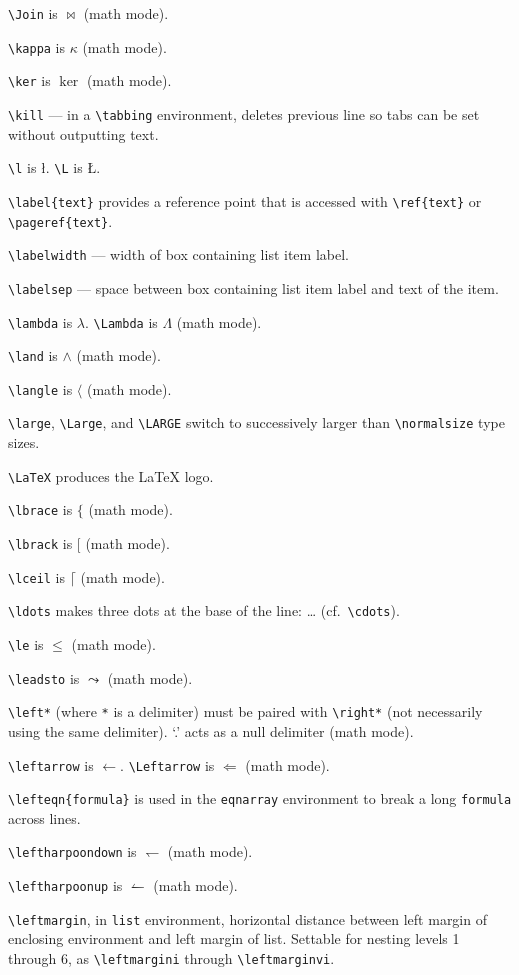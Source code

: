 \verb"\Join" is $\Join$ (math mode).

\verb"\kappa" is $\kappa$ (math mode).

\verb"\ker" is $\ker$ (math mode).

\verb"\kill" --- in a \verb"\tabbing" environment, deletes previous line so
	tabs can be set without outputting text.

\verb"\l" is \l.  \verb"\L" is \L.

\verb"\label{text}" provides a reference point that is accessed with
	\verb"\ref{text}" or \verb"\pageref{text}".

\verb"\labelwidth" --- width of box containing list item label.

\verb"\labelsep" --- space between box containing list item label and text
	of the item.

\verb"\lambda" is $\lambda$. \verb"\Lambda" is $\Lambda$ (math mode).

\verb"\land" is $\land$ (math mode).

\verb"\langle" is $\langle$ (math mode).

\verb"\large", \verb"\Large", and \verb"\LARGE" switch to successively
	larger than \verb"\normalsize" type sizes.

\verb"\LaTeX" produces the \LaTeX{} logo.

\verb"\lbrace" is $\lbrace$ (math mode).

\verb"\lbrack" is $\lbrack$ (math mode).

\verb"\lceil" is $\lceil$ (math mode).

\verb"\ldots" makes three dots at the base of the line: \ldots
	(cf.\ \verb"\cdots").

\verb"\le" is $\le$ (math mode).

\verb"\leadsto" is $\leadsto$ (math mode).

\verb"\left*" (where \verb"*" is a delimiter) must be paired with
	\verb"\right*" (not necessarily using the same delimiter).
	`.' acts as a null delimiter (math mode).

\verb"\leftarrow" is $\leftarrow$. \verb"\Leftarrow" is $\Leftarrow$
	(math mode).

\verb"\lefteqn{formula}" is used in the \verb"eqnarray" environment to
	break a long \verb"formula" across lines.

\verb"\leftharpoondown" is $\leftharpoondown$ (math mode).

\verb"\leftharpoonup" is $\leftharpoonup$ (math mode).

\verb"\leftmargin", in \verb"list" environment, horizontal distance between left
	margin of enclosing environment and left margin of list.
	Settable for nesting levels 1 through 6, as \verb"\leftmargini"
	through \verb"\leftmarginvi".

